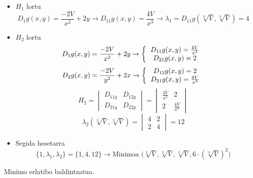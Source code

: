 \begin{itemize}
    \item $H_1$ lortu
        \begin{equation*}
        D_{1}g(x,y) = \frac{-2V}{x^2} + 2y
        \rightarrow
        D_{11}g(x,y) = \frac{4V}{x^3}
        \rightarrow
        \lambda_{1} = D_{11}g(\sqrt[3]{V}, \sqrt[3]{V}) = 4
        \end{equation*}
\item $H_2$ lortu
    \begin{equation*}
        D_{1}g(x,y) = \frac{-2V}{x^2} + 2y
        \rightarrow
        \left\{
        \begin{tabular}{c}
        $D_{11}g(x,y) = \frac{4V}{x^3}$ \\
        $D_{21}g(x,y) = 2$
        \end{tabular}
        \right.
    \end{equation*}
    \begin{equation*}
        D_{2}g(x,y) = \frac{-2V}{y^2} + 2x
        \rightarrow
        \left\{
        \begin{tabular}{c}
        $D_{12}g(x,y) = 2$ \\
        $D_{21}g(x,y) = \frac{4V}{x^3}$
        \end{tabular}
        \right.
    \end{equation*}
    \begin{equation*}
        H_2 = 
    \begin{vmatrix}
        D_{11g} & D_{12g}\\
        D_{21g} & D_{22g}
    \end{vmatrix}
    =
    \begin{vmatrix}
        \frac{4V}{x^3} & 2\\
        2 & \frac{4V}{x^3}
    \end{vmatrix}
    \end{equation*}
    \begin{equation*}
        \lambda_{2}(\sqrt[3]{V},\sqrt[3]{V}) = 
    \begin{vmatrix}
        4 & 2\\
        2 & 4
    \end{vmatrix}
    = 12
    \end{equation*}
\item Segida hesetarra
    \begin{equation*}
    \{1, \lambda_{1}, \lambda_{2}\} = \{1, 4, 12\}
    \rightarrow
    \boxed{\text{Minimoa }\Big(\sqrt[3]{V}, \sqrt[3]{V}, \sqrt[3]{V}, 6\cdot(\sqrt[3]{V})^2\Big)}
    \end{equation*}
\end{itemize}
\centering Minimo erlatibo baldintzatua.





